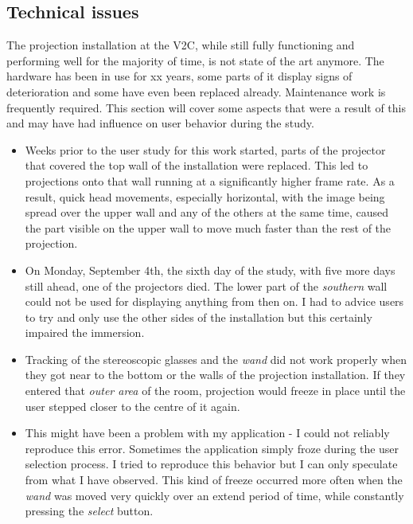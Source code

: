 		\subsection{Technical issues}
		\label{sec:technical_issues}
The projection installation at the V2C, while still fully functioning and performing well for the majority of time, is not state of the art anymore. The hardware has been in use for xx years, some parts of it display signs of deterioration and some have even been replaced already. Maintenance work is frequently required. This section will cover some aspects that were a result of this and may have had influence on user behavior during the study.

\begin{itemize}
	\item Weeks prior to the user study for this work started, parts of the projector that covered the top wall of the installation were replaced. This led to projections onto that wall running at a significantly higher frame rate. As a result, quick head movements, especially horizontal, with the image being spread over the upper wall and any of the others at the same time, caused the part visible on the upper wall to move much faster than the rest of the projection.
	\item On Monday, September 4th, the sixth day of the study, with five more days still ahead, one of the projectors died. The lower part of the \textit{southern} wall could not be used for displaying anything from then on. I had to advice users to try and only use the other sides of the installation but this certainly impaired the immersion. 
	\item Tracking of the stereoscopic glasses and the \textit{wand} did not work properly when they got near to the bottom or the walls of the projection installation. If they entered that \textit{outer area} of the room, projection would freeze in place until the user stepped closer to the centre of it again.
	\item This might have been a problem with my application - I could not reliably reproduce this error. Sometimes the application simply froze during the user selection process. I tried to reproduce this behavior but I can only speculate from what I have observed. This kind of freeze occurred more often when the \textit{wand} was moved very quickly over an extend period of time, while constantly pressing the \textit{select} button.
\end{itemize}

